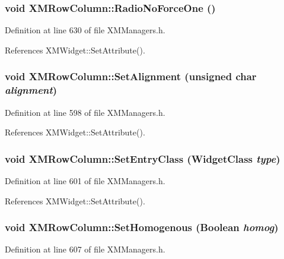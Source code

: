 \subsubsection{\setlength{\rightskip}{0pt plus 5cm}void XMRow\-Column::Radio\-No\-Force\-One ()\hspace{0.3cm}{\tt  [inline]}}\label{classXMRowColumn_a16}




Definition at line 630 of file XMManagers.h.

References XMWidget::Set\-Attribute().
\subsubsection{\setlength{\rightskip}{0pt plus 5cm}void XMRow\-Column::Set\-Alignment (unsigned char {\em alignment})\hspace{0.3cm}{\tt  [inline]}}\label{classXMRowColumn_a5}




Definition at line 598 of file XMManagers.h.

References XMWidget::Set\-Attribute().
\subsubsection{\setlength{\rightskip}{0pt plus 5cm}void XMRow\-Column::Set\-Entry\-Class (Widget\-Class {\em type})\hspace{0.3cm}{\tt  [inline]}}\label{classXMRowColumn_a6}




Definition at line 601 of file XMManagers.h.

References XMWidget::Set\-Attribute().
\subsubsection{\setlength{\rightskip}{0pt plus 5cm}void XMRow\-Column::Set\-Homogenous (Boolean {\em homog})\hspace{0.3cm}{\tt  [inline]}}\label{classXMRowColumn_a8}




Definition at line 607 of file XMManagers.h.

